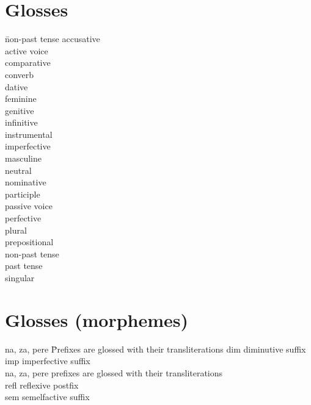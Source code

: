 
\section*{Glosses}
\begin{multicols}{3}
\begin{tabbing}
 \hspace{.5em}\= non-past tense\kill
{} \> accusative\\
 \> active voice\\
 \> comparative\\
 \> converb\\
 \> dative\\
 \> feminine\\
 \> genitive\\
 \> infinitive\\
 \> instrumental\\
 \> imperfective\\
 \> masculine\\
 \> neutral\\
 \> nominative\\
 \> participle\\
 \> passive voice\\
 \> perfective\\
 \> plural\\
 \> prepositional\\
 \> non-past tense\\
 \> past tense\\
 \> singular
\end{tabbing}
\end{multicols}

\section*{Glosses (morphemes)}
\begin{tabbing}
na, za, pere \hspace{1em}\= Prefixes are glossed with their transliterations\kill
dim \> diminutive suffix\\
imp \> imperfective suffix\\
na, za, pere \> prefixes are glossed with their transliterations\\
refl \> reflexive postfix\\
sem \> semelfactive suffix
\end{tabbing}

